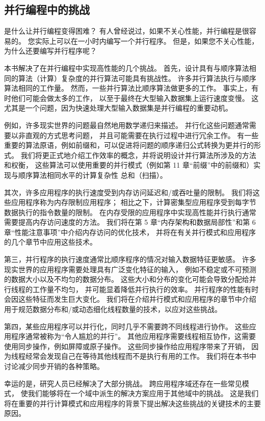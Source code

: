 \subsection{并行编程中的挑战}
是什么让并行编程变得困难？ 有人曾经说过，如果不关心性能，并行编程是很容易的。 您实际上可以在一小时内编写一个并行程序。 
但是，如果您不关心性能，为什么还要编写并行程序呢？

本书解决了在并行编程中实现高性能的几个挑战。 首先，设计具有与顺序算法相同的算法（计算）复杂度的并行算法可能具有挑战性。 
许多并行算法执行与顺序算法相同的工作量。 然而，一些并行算法比顺序算法做更多的工作。 事实上，有时他们可能会做太多的工作，
以至于最终在大型输入数据集上运行速度变慢。 这尤其是一个问题，因为快速处理大型输入数据集是并行编程的重要动机。

例如，许多现实世界的问题最自然地用数学递归来描述。 并行化这些问题通常需要以非直观的方式思考问题，
并且可能需要在执行过程中进行冗余工作。 有一些重要的算法原语，例如前缀和，可以促进将问题的顺序递归公式转换为更并行的形式。 
我们将更正式地介绍工作效率的概念，并将说明设计并行算法所涉及的方法和权衡，
这些算法可以使用重要的并行模式（例如第 11 章“前缀”中的前缀和）实现与顺序算法相同水平的计算复杂性 总和（扫描）。

其次，许多应用程序的执行速度受到内存访问延迟和/或吞吐量的限制。 我们将这些应用程序称为内存限制应用程序； 
相比之下，计算密集型应用程序受到每字节数据执行的指令数量的限制。 
在内存受限的应用程序中实现高性能并行执行通常需要提高内存访问速度的方法。 
我们将在第 5 章“内存架构和数据局部性”和第 6 章“性能注意事项”中介绍内存访问的优化技术，
并将在有关并行模式和应用程序的几个章节中应用这些技术。

第三，并行程序的执行速度通常比顺序程序的情况对输入数据特征更敏感。 许多现实世界的应用程序需要处理具有广泛变化特征的输入，
例如不稳定或不可预测的数据大小以及不均匀的数据分布。 这些大小和分布的变化可能会导致分配给并行线程的工作量不均匀，
并可能显着降低并行执行的效率。 并行程序的性能有时会因这些特征而发生巨大变化。 
我们将在介绍并行模式和应用程序的章节中介绍用于规范数据分布和/或动态细化线程数量的技术，以应对这些挑战。

第四，某些应用程序可以并行化，同时几乎不需要跨不同线程进行协作。 这些应用程序通常被称为“令人尴尬的并行”。 
其他应用程序需要线程相互协作，这需要使用同步操作，例如屏障或原子操作。 这些同步操作给应用程序带来了开销，
因为线程经常会发现自己在等待其他线程而不是执行有用的工作。 我们将在本书中讨论减少同步开销的各种策略。

幸运的是，研究人员已经解决了大部分挑战。 跨应用程序域还存在一些常见模式，
使我们能够将在一个域中派生的解决方案应用于其他域中的挑战。 
这是我们将在重要的并行计算模式和应用程序的背景下提出解决这些挑战的关键技术的主要原因。

